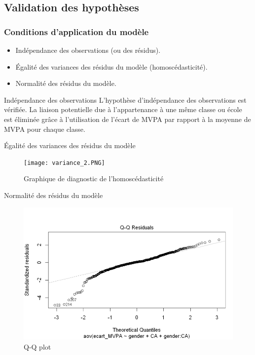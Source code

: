 \documentclass{beamer}
\begin{document}
	\subsection{Validation des hypothèses}
		\begin{frame}
			\frametitle{Conditions d'application du modèle} 
			\begin{itemize}
				\item \textcolor{sectioncolor}{Indépendance des observations (ou des résidus).}
				\vfill
				\item \textcolor{sectioncolor}{Égalité des variances des résidus du modèle (homoscédasticité).}
				\vfill
				\item \textcolor{sectioncolor}{Normalité des résidus du modèle.}
			\end{itemize}
		\end{frame}
		
		
		\begin{frame}{Indépendance des observations}
			L'hypothèse d'indépendance des observations est vérifiée. La liaison potentielle due à l'appartenance à une même classe ou école est éliminée grâce à l'utilisation de l'écart de MVPA par rapport à la moyenne de MVPA pour chaque classe.
		\end{frame}
		
		
		\begin{frame}{Égalité des variances des résidus du modèle}
			\begin{figure}[H]
				\centering
				\texttt{[image: variance\_2.PNG]}
				\caption{Graphique de diagnostic de l'homoscédasticité}
				\label{fig:variance2}
			\end{figure}
		\end{frame}
		
		\begin{frame}{Normalité des résidus du modèle}
			\begin{figure}[H]
				\centering
				\includegraphics[width=0.8\linewidth]{Normalité_2.PNG}
				\caption{Q-Q plot}
				\label{fig:QQplot_2}
			\end{figure}
		\end{frame}
		
\end{document}
